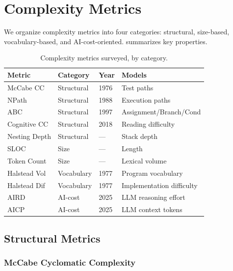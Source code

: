 \documentclass[10pt,twocolumn,letterpaper]{article}
\begin{document}
\section{Complexity Metrics}
\label{sec:metrics}

We organize complexity metrics into four categories: structural,
size-based, vocabulary-based, and AI-cost-oriented.  
summarizes key properties.

\begin{table}[t]
\centering
\footnotesize
\begin{tabular}{@{}llll@{}}
\toprule
\textbf{Metric} & \textbf{Category} & \textbf{Year} & \textbf{Models} \\
\midrule
McCabe CC    & Structural    & 1976 & Test paths \\
NPath        & Structural    & 1988 & Execution paths \\
ABC          & Structural    & 1997 & Assignment/Branch/Cond \\
Cognitive CC & Structural    & 2018 & Reading difficulty \\
Nesting Depth & Structural   & ---  & Stack depth \\
\midrule
SLOC         & Size          & ---  & Length \\
Token Count  & Size          & ---  & Lexical volume \\
\midrule
Halstead Vol & Vocabulary    & 1977 & Program vocabulary \\
Halstead Dif & Vocabulary    & 1977 & Implementation difficulty \\
\midrule
AIRD         & AI-cost       & 2025 & LLM reasoning effort \\
AICP         & AI-cost       & 2025 & LLM context tokens \\
\bottomrule
\end{tabular}
\caption{Complexity metrics surveyed, by category.}
\label{tab:metrics}
\end{table}

\subsection{Structural Metrics}

\subsubsection{McCabe Cyclomatic Complexity}
\end{document}
